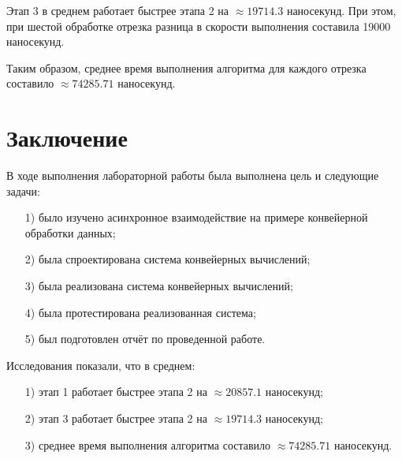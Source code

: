 \documentclass[12pt]{report}
\begin{document}
Этап 3 в среднем работает быстрее этапа 2 на $\approx 19714.3$ наносекунд. При этом, при шестой обработке отрезка разница в скорости выполнения составила 19000 наносекунд.

Таким образом, среднее время выполнения алгоритма для каждого отрезка составило $\approx 74285.71$ наносекунд.

\chapter*{Заключение}
В ходе выполнения лабораторной работы была выполнена цель и следующие задачи:
\begin{enumerate}
\item[1)] было изучено асинхронное взаимодействие на примере конвейерной обработки данных;
\item[2)] была спроектирована система конвейерных вычислений;
\item[3)] была реализована система конвейерных вычислений;
\item[4)] была протестирована реализованная система;
\item[5)] был подготовлен отчёт по проведенной работе.
\end{enumerate}

Исследования показали, что в среднем:
\begin{enumerate}
\item[1)] этап 1 работает быстрее этапа 2 на $\approx 20857.1$ наносекунд;
\item[2)] этап 3 работает быстрее этапа 2 на $\approx 19714.3$ наносекунд;
\item[3)] среднее время выполнения алгоритма составило $\approx 74285.71$ наносекунд.
\end{enumerate}

\end{document}
